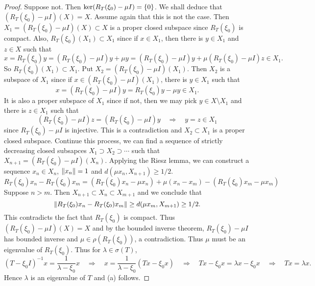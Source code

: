 \begin{proof}
    Suppose not. Then $\ker(R_T(\xi_0) - \mu I) = \left\{ {0} \right\}$. We shall 
    deduce that $(R_T(\xi_0) - \mu I)(X) = X$. Assume again that 
    this is not the case. Then $X_1 = (R_T(\xi_0) - \mu I)(X)\subset X$ is 
    a proper closed subspace since $R_T(\xi_0)$ is compact. Also, 
    $R_T(\xi_0)(X_1) \subset X_1$ since if $x\in X_1$, then there is $y\in X_1$ 
    and $z\in X$ such that 
    \begin{equation*}
        x = R_T(\xi_0)y = (R_T(\xi_0) - \mu I)y + \mu y = (R_T(\xi_0) - \mu I)y + \mu(R_T(\xi_0) - \mu I)z \in X_1.   
    \end{equation*}
    So $R_T(\xi_0)(X_1) \subset X_1$. Put $X_2 = (R_T(\xi_0) - \mu I)(X_1)$. 
    Then $X_2$ is a subspace of $X_1$ since if $x\in (R_T(\xi_0) - \mu I)(X_1)$, 
    there is $y\in X_1$ such that 
    \begin{equation*}
        x = (R_T(\xi_0) - \mu I)y = R_T(\xi_0)y - \mu y \in X_1.
    \end{equation*} 
    It is also a proper subspace of $X_1$ since if not, then we may 
    pick $y\in X\setminus X_1$ and there is $z\in X_1$ such that 
    \begin{equation*}
        (R_T(\xi_0) - \mu I)z = (R_T(\xi_0) - \mu I)y\quad\Rightarrow\quad 
        y = z\in X_1
    \end{equation*}
    since $R_T(\xi_0) - \mu I$ is injective. This is a contradiction 
    and $X_2\subset X_1$ is a proper closed subspace. Continue this 
    process, we can find a sequence of strictly decreasing closed subsapces 
    $X_1\supset X_2\supset\cdots$ such that $X_{n+1} = (R_T(\xi_0) - \mu I)(X_n)$. 
    Applying the Riesz lemma, we can construct a sequence $x_n\in X_n$, 
    $\left\lVert {x_n} \right\rVert = 1$ and $d(\mu x_n, X_{n+1}) \geq 1/2$. 
    \begin{equation*}
        R_T(\xi_0)x_n - R_T(\xi_0)x_m 
        = (R_T(\xi_0)x_n - \mu x_n) + \mu(x_n - x_m) - (R_T(\xi_0)x_m - \mu x_m)
    \end{equation*}
    Suppose $n> m$. Then $X_{n+1}\subset X_n\subset X_{m+1}$ and 
    we conclude that 
    \begin{equation*}
        \left\lVert {R_T(\xi_0)x_n - R_T(\xi_0)x_m} \right\rVert \geq d(\mu x_m, X_{m+1}) 
        \geq 1/2. 
    \end{equation*}
    This contradicts the fact that $R_T(\xi_0)$ is compact. Thus 
    $(R_T(\xi_0) - \mu I)(X) = X$ and by the bounded inverse theorem, 
    $R_T(\xi_0) - \mu I$ has bounded inverse and $\mu\in\rho(R_T(\xi_0))$, 
    a contradiction. Thus $\mu$ must be an eigenvalue of $R_T(\xi_0)$. 
    Thus for $\lambda\in\sigma(T)$, 
    \begin{equation*}
        (T - \xi_0 I)^{-1}x = \frac{1}{\lambda - \xi_0}x
        \quad\Rightarrow\quad 
        x = \frac{1}{\lambda - \xi_0}(Tx - \xi_0 x)
        \quad\Rightarrow\quad
        Tx - \xi_0 x = \lambda x - \xi_0 x
        \quad\Rightarrow\quad
        Tx = \lambda x.
    \end{equation*}
    Hence $\lambda$ is an eigenvalue of $T$ and (a) follows. 


\end{proof}
